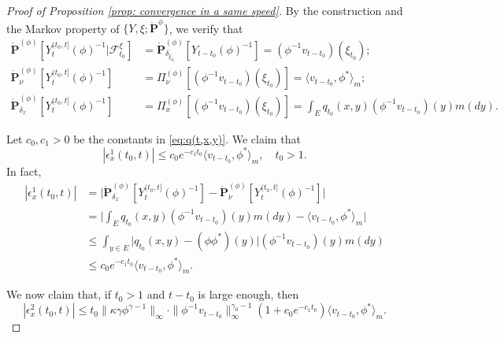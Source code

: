 \documentclass[12pt, a4paper]{amsart}
\theoremstyle{definition}
\numberwithin{equation}{section}
\begin{document}
\begin{proof}[Proof of Proposition \ref{prop: convergence in a same speed}]
	By the construction and the Markov property of $\{Y,\xi; \dot {\mathbf P}^{\phi}\}$, 
	we verify that
\[\label{eq: some equations for PY-1}\begin{split}
	\dot{\mathbf P}^{(\phi)} [Y_t^{(t_0,t]}(\phi)^{-1}|\mathscr F^\xi_{t_0}]
	&= \dot{\mathbf P}_{\delta_{\xi_{t_0}}}^{(\phi)}  [Y_{t-t_0}(\phi)^{-1}]
	= (\phi^{-1}v_{t-t_0})(\xi_{t_0});
	\\ \dot{\mathbf P}_\nu^{(\phi)}[Y_t^{(t_0,t]}(\phi)^{-1}]
	&= \Pi_{\nu}^{(\phi)}[(\phi^{-1}v_{t-t_0})(\xi_{t_0}) ]
	= \langle v_{t-t_0},\phi^* \rangle_m;
	\\ \dot{\mathbf P}_{\delta_x}^{(\phi)}[Y_t^{(t_0,t]}(\phi)^{-1}]
	&= \Pi_x^{(\phi)}[(\phi^{-1}v_{t-t_0})(\xi_{t_0}) ]
	=  \int_E  q_{t_0}(x,y)(\phi^{-1}v_{t-t_0})(y) m(dy).
\end{split}\]

	Let  $c_0, c_1>0$ be the constants in \eqref{eq:q(t,x,y)}. 
	We claim that
\[\label{eq: bound for epsilon1}
	|\epsilon_x^1(t_0,t)|
	\leq c_0 e^{-c_1 t_0}\langle v_{t-t_0},\phi^* \rangle_m,
    \quad t_0 > 1.
\]
	In fact,
\[\label{eq:epsilon-1}\begin{split}
	|\epsilon_x^1(t_0,t)|
	& = \big| \dot {\mathbf P}_{\delta_x}^{(\phi)} [Y^{(t_0,t]}_t(\phi)^{-1}] - \dot {\mathbf P}_\nu^{(\phi)} [Y^{(t_0,t]}_t(\phi)^{-1}] \big| \\
	& = \big|  \int_E  q_{t_0}(x,y)(\phi^{-1}v_{t-t_0})(y) m(dy) - \langle v_{t-t_0},\phi^* \rangle_m \big|\\
	& \leq \int_{y\in E} \big| q_{t_0}(x,y) - (\phi\phi^*)(y) \big| (\phi^{-1}v_{t-t_0})(y) m(dy)\\
	& \leq c_0 e^{-c_1 t_0}\langle v_{t-t_0},\phi^* \rangle_m .
\end{split}\]

	We now claim that, if $t_0 > 1$ and $t-t_0$ is large enough, then
\[\label{eq:upperbound_of_epsilon-2}
	|\epsilon_x^2(t_0,t)|
	\leq t_0\|\kappa\gamma\phi^{\gamma - 1}\|_{\infty} \cdot \|\phi^{-1}v_{t-t_0}\|^{\gamma_0-1}_\infty (1+c_0 e^{-c_1 t_0}) \langle v_{t-t_0},\phi^* \rangle_m.
\]
	

\end{proof}
\end{document}
